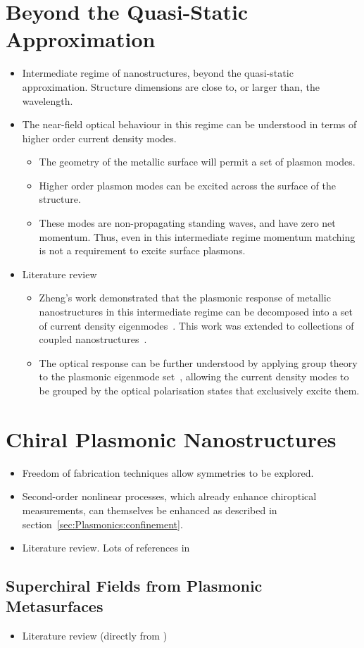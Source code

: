 \section{Beyond the Quasi-Static Approximation}
\begin{itemize}
    \item Intermediate regime of nanostructures, beyond the quasi-static approximation. Structure dimensions are close to, or larger than, the wavelength.
    \item The near-field optical behaviour in this regime can be understood in terms of higher order current density modes.
    \begin{itemize}
        \item The geometry of the metallic surface will permit a set of plasmon modes.
        \item Higher order plasmon modes can be excited across the surface of the structure.
        \item These modes are non-propagating standing waves, and have zero net momentum. Thus, even in this intermediate regime momentum matching is not a requirement to excite surface plasmons.
    \end{itemize}
    \item Literature review
    \begin{itemize}
        \item Zheng's work demonstrated that the plasmonic response of metallic nanostructures in this intermediate regime can be decomposed into a set of current density eigenmodes~\cite{Zheng2012}. This work was extended to collections of coupled nanostructures~\cite{Zheng2013}. 
        \item The optical response can be further understood by applying group theory to the plasmonic eigenmode set~\cite{Zheng2015}, allowing the current density modes to be grouped by the optical polarisation states that exclusively excite them.
    \end{itemize}
\end{itemize}


\section{Chiral Plasmonic Nanostructures}
\begin{itemize}
    \item Freedom of fabrication techniques allow symmetries to be explored.
    \item Second-order nonlinear processes, which already enhance chiroptical measurements, can themselves be enhanced as described in section~\ref{sec:Plasmonics:confinement}.
    \item Literature review. Lots of references in~\cite[\S 3.2]{Collins2017}
\end{itemize}

\subsection{Superchiral Fields from Plasmonic Metasurfaces}
\begin{itemize}
    \item Literature review (directly from \cite[\S 4.3]{Collins2017})
\end{itemize}